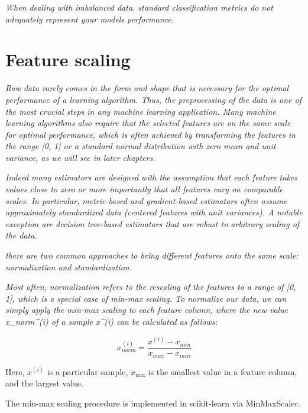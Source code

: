 \textit{When dealing with imbalanced data, standard classification metrics do not adequately represent your models performance.}

\section{Feature scaling} \label{sec:feature_scaling}

\textit{Raw data rarely comes in the form and shape that is necessary for the optimal performance of a learning algorithm. Thus, the preprocessing of the data is one of the most crucial steps in any machine learning application. Many machine learning algorithms also require that the selected features are on the same scale for optimal performance, which is often achieved by transforming the features in the range [0, 1] or a standard normal distribution with zero mean and unit variance, as we will see in later chapters.}

\textit{Indeed many estimators are designed with the assumption that each feature takes values close to zero or more importantly that all features vary on comparable scales. In particular, metric-based and gradient-based estimators often assume approximately standardized data (centered features with unit variances). A notable exception are decision tree-based estimators that are robust to arbitrary scaling of the data.}\cite{Scikit-learndevelopers2019b}

\textit{there are two common approaches to bring different features onto the same scale: normalization and standardization.}

\textit{Most often, normalization refers to the rescaling of the features to a range of [0, 1], which is a special case of min-max scaling. To normalize our data, we can simply apply the min-max scaling to each feature column, where the new value x_{norm}^{(i)} of a sample x^{(i)} can be calculated as follows:}

\begin{equation} \label{eq:normalization}
    x_{norm}^{(i)} = \frac{x^{(i)} - x_{min}} {x_{max} - x_{min}}
\end{equation}

Here, $x^{(i)}$ is a particular sample, $x_{\min}$ is the smallest value in a feature column, and  the largest value.

The min-max scaling procedure is implemented in scikit-learn via MinMaxScaler.

